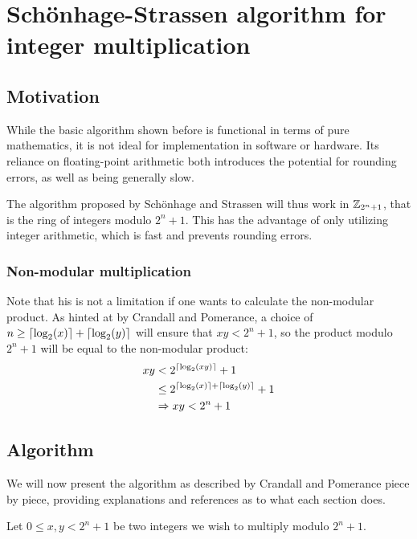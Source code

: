 \chapter{Schönhage-Strassen algorithm for integer multiplication}
\label{chapter:schoenhage_strassen}

\section{Motivation}

While the basic algorithm shown before is functional in terms of pure
mathematics, it is not ideal for implementation in software or hardware. Its
reliance on floating-point arithmetic both introduces the potential for
rounding errors, as well as being generally slow.

The algorithm proposed by Schönhage and Strassen will thus work in
$\mathbb{Z}_{2^n + 1}$, that is the ring of integers modulo $2^n + 1$. This has
the advantage of only utilizing integer arithmetic, which is fast and prevents
rounding errors.

\subsection{Non-modular multiplication}

Note that his is not a limitation if one wants to calculate the non-modular
product. As hinted at by Crandall and Pomerance,
\autocite{crandallPrimeNumbersComputational2005} a choice of $n \geq
\lceil\log_2(x)\rceil + \lceil\log_2(y)\rceil$ will ensure that $xy < 2^n + 1$, so the
product modulo $2^n + 1$ will be equal to the non-modular product:
\begin{align*}
		xy & < 2^{\lceil\log_2(xy)\rceil} + 1 \\
		   & \leq 2^{\lceil\log_2(x)\rceil + \lceil\log_2(y)\rceil} + 1 \\
		   & \Rightarrow xy < 2^n + 1
\end{align*}

\section{Algorithm}

We will now present the algorithm as described by Crandall and Pomerance
\autocite{crandallPrimeNumbersComputational2005} piece by piece, providing
explanations and references as to what each section does.

Let $0 \leq x, y < 2^n + 1$ be two integers we wish to multiply modulo $2^n +
1$.

